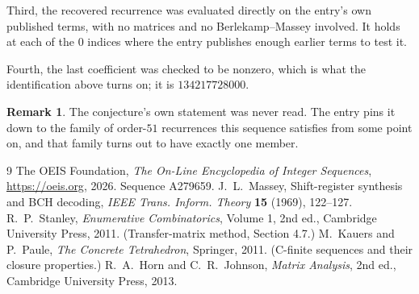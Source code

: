 \documentclass[11pt,a4paper]{article}
\theoremstyle{plain}
\theoremstyle{definition}
\newtheorem{remark}[theorem]{Remark}
\begin{document}
Third, the recovered recurrence was evaluated directly on the entry's own published terms, with
no matrices and no Berlekamp--Massey involved. It holds at each of the $0$ indices where
the entry publishes enough earlier terms to test it.

Fourth, the last coefficient was checked to be nonzero, which is what the identification above
turns on; it is $134217728000$.

\begin{remark}
The conjecture's own statement was never read. The entry pins it down to the family of
order-$51$ recurrences this sequence satisfies from some point on, and that family turns
out to have exactly one member.
\end{remark}

\begin{thebibliography}{9}
 The OEIS Foundation, \emph{The On-Line Encyclopedia of Integer
Sequences}, \url{https://oeis.org}, 2026. Sequence A279659.
 J.~L.~Massey, Shift-register synthesis and BCH decoding, \emph{IEEE
Trans. Inform. Theory} \textbf{15} (1969), 122--127.
 R.~P.~Stanley, \emph{Enumerative Combinatorics}, Volume 1, 2nd ed.,
Cambridge University Press, 2011. (Transfer-matrix method, Section 4.7.)
 M.~Kauers and P.~Paule, \emph{The Concrete Tetrahedron}, Springer, 2011.
(C-finite sequences and their closure properties.)
 R.~A.~Horn and C.~R.~Johnson, \emph{Matrix Analysis}, 2nd ed., Cambridge
University Press, 2013.
\end{thebibliography}
\end{document}
